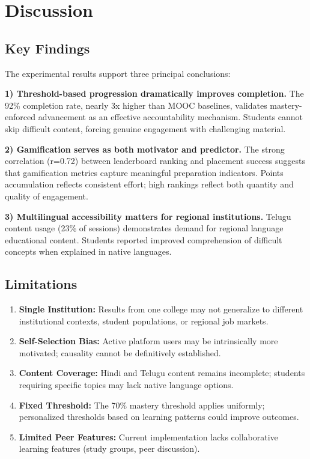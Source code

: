 \documentclass[journal]{IEEEtran}
\begin{document}
\section{Discussion}
\label{sec:discussion}

\subsection{Key Findings}

The experimental results support three principal conclusions:

\textbf{1) Threshold-based progression dramatically improves completion.} The 92\% completion rate, nearly 3x higher than MOOC baselines, validates mastery-enforced advancement as an effective accountability mechanism. Students cannot skip difficult content, forcing genuine engagement with challenging material.

\textbf{2) Gamification serves as both motivator and predictor.} The strong correlation (r=0.72) between leaderboard ranking and placement success suggests that gamification metrics capture meaningful preparation indicators. Points accumulation reflects consistent effort; high rankings reflect both quantity and quality of engagement.

\textbf{3) Multilingual accessibility matters for regional institutions.} Telugu content usage (23\% of sessions) demonstrates demand for regional language educational content. Students reported improved comprehension of difficult concepts when explained in native languages.

\subsection{Limitations}

\begin{enumerate}
    \item \textbf{Single Institution:} Results from one college may not generalize to different institutional contexts, student populations, or regional job markets.

    \item \textbf{Self-Selection Bias:} Active platform users may be intrinsically more motivated; causality cannot be definitively established.

    \item \textbf{Content Coverage:} Hindi and Telugu content remains incomplete; students requiring specific topics may lack native language options.

    \item \textbf{Fixed Threshold:} The 70\% mastery threshold applies uniformly; personalized thresholds based on learning patterns could improve outcomes.

    \item \textbf{Limited Peer Features:} Current implementation lacks collaborative learning features (study groups, peer discussion).
\end{enumerate}
\end{document}

